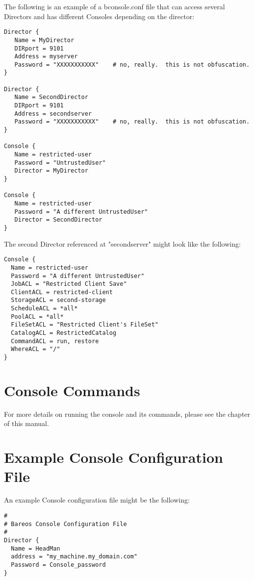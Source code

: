The following is an example of a bconsole.conf file that can access
several Directors and has different Consoles depending on the director:

\footnotesize
\begin{verbatim}
Director {
   Name = MyDirector
   DIRport = 9101
   Address = myserver
   Password = "XXXXXXXXXXX"    # no, really.  this is not obfuscation.
}

Director {
   Name = SecondDirector
   DIRport = 9101
   Address = secondserver
   Password = "XXXXXXXXXXX"    # no, really.  this is not obfuscation.
}

Console {
   Name = restricted-user
   Password = "UntrustedUser"
   Director = MyDirector
}

Console {
   Name = restricted-user
   Password = "A different UntrustedUser"
   Director = SecondDirector
}
\end{verbatim}
\normalsize

The second Director referenced at "secondserver" might look
like the following:

\footnotesize
\begin{verbatim}
Console {
  Name = restricted-user
  Password = "A different UntrustedUser"
  JobACL = "Restricted Client Save"
  ClientACL = restricted-client
  StorageACL = second-storage
  ScheduleACL = *all*
  PoolACL = *all*
  FileSetACL = "Restricted Client's FileSet"
  CatalogACL = RestrictedCatalog
  CommandACL = run, restore
  WhereACL = "/"
}
\end{verbatim}
\normalsize



\section{Console Commands}

For more details on running the console and its commands, please see the
 chapter of this manual.

\section{Example Console Configuration File}


An example Console configuration file might be the following:

\footnotesize
\begin{verbatim}
#
# Bareos Console Configuration File
#
Director {
  Name = HeadMan
  address = "my_machine.my_domain.com"
  Password = Console_password
}
\end{verbatim}
\normalsize
